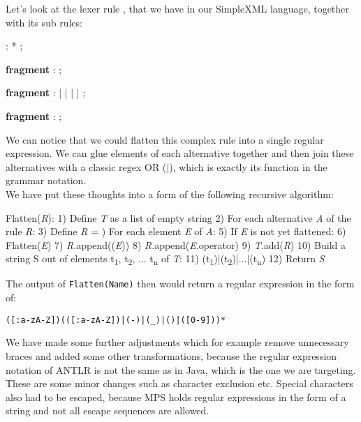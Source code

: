 \pagebreak

Let's look at the lexer rule , that we have in our SimpleXML language, together with its sub rules:

\begin{antlr}
	         :    * ;
	
	\textbf{fragment}
	        :   \regex{[0-9]} ;
	
	\textbf{fragment}
	     :   
	             |   \literal{-} | \literal{_} | 
	             |   
	             ;
	
	\textbf{fragment}
	:   \regex{[:a-zA-Z]} ;
\end{antlr}

We can notice that we could flatten this complex rule into a single regular expression. We can glue elements of each alternative together and then join these alternatives with a classic regex OR ($|$), which is exactly its function in the grammar notation.
\\

We have put these thoughts into a form of the following recursive algorithm:    

\begin{antlr}
Flatten(\textit{R}):
     1) Define \textit{T} as a list of empty string
     2) For each alternative \textit{A} of the rule \textit{R}:
     3)     Define \textit{R} = \ap{})     For each element \textit{E} of \textit{A}:
     5)         If \textit{E} is not yet flattened:
     6)             Flatten(\textit{E})
     7)         \textit{R}.append((\textit{E}))
     8)         \textit{R}.append(\textit{E}.operator)
     9)     \textit{T}.add(\textit{R})
    10) Build a string S out of elements t\textsubscript{1}, t\textsubscript{2}, ... t\textsubscript{n} of \textit{T}:
    11)     (t\textsubscript{1})|(t\textsubscript{2})|...|(t\textsubscript{n})
    12) Return \textit{S}
\end{antlr}

The output of \texttt{Flatten(Name)} then would return a regular expression in the form of:

\begin{center}
	\texttt{([:a-zA-Z])(([:a-zA-Z])|(-)|({\_})|(\.)|([0-9]))*}
\end{center}

We have made some further adjustments which for example remove unnecessary braces and added some other transformations, because the regular expression notation of ANTLR is not the same as in Java, which is the one we are targeting. These are some minor changes such as character exclusion etc. Special characters also had to be escaped, because MPS holds regular expressions in the form of a string and not all escape sequences are allowed.

